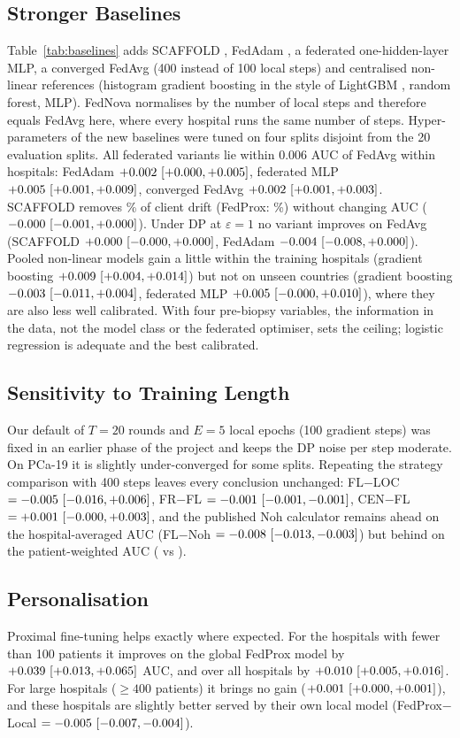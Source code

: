 \subsection{Stronger Baselines}
\label{sec:p19_baselines}
Table~\ref{tab:baselines} adds SCAFFOLD \cite{Karimireddy2020Scaffold}, FedAdam \cite{Reddi2021FedOpt}, a federated one-hidden-layer MLP, a converged FedAvg (400 instead of 100 local steps) and centralised non-linear references (histogram gradient boosting in the style of LightGBM \cite{Ke2017LightGBM}, random forest, MLP). FedNova \cite{Wang2020FedNova} normalises by the number of local steps and therefore equals FedAvg here, where every hospital runs the same number of steps. Hyper-parameters of the new baselines were tuned on four splits disjoint from the 20 evaluation splits. All federated variants lie within 0.006 AUC of FedAvg within hospitals: FedAdam $+0.002\ [+0.000, +0.005]$, federated MLP $+0.005\ [+0.001, +0.009]$, converged FedAvg $+0.002\ [+0.001, +0.003]$. SCAFFOLD removes \blScafDrift\% of client drift (FedProx: \blProxDrift\%) without changing AUC ($-0.000\ [-0.001, +0.000]$). Under DP at $\varepsilon=1$ no variant improves on FedAvg (SCAFFOLD $+0.000\ [-0.000, +0.000]$, FedAdam $-0.004\ [-0.008, +0.000]$). Pooled non-linear models gain a little within the training hospitals (gradient boosting $+0.009\ [+0.004, +0.014]$) but not on unseen countries (gradient boosting $-0.003\ [-0.011, +0.004]$, federated MLP $+0.005\ [-0.000, +0.010]$), where they are also less well calibrated. With four pre-biopsy variables, the information in the data, not the model class or the federated optimiser, sets the ceiling; logistic regression is adequate and the best calibrated.



\subsection{Sensitivity to Training Length}
Our default of $T=20$ rounds and $E=5$ local epochs (100 gradient steps) was fixed in an earlier phase of the project and keeps the DP noise per step moderate. On PCa-19 it is slightly under-converged for some splits. Repeating the strategy comparison with 400 steps leaves every conclusion unchanged: FL$-$LOC $=-0.005\ [-0.016, +0.006]$, FR$-$FL $=-0.001\ [-0.001, -0.001]$, CEN$-$FL $=+0.001\ [-0.000, +0.003]$, and the published Noh calculator remains ahead on the hospital-averaged AUC (FL$-$Noh $=-0.008\ [-0.013, -0.003]$) but behind on the patient-weighted AUC (\cvgWFL{} vs \cvgWNoh{}).

\subsection{Personalisation}
Proximal fine-tuning helps exactly where expected. For the \pNSmall{} hospitals with fewer than 100 patients it improves on the global FedProx model by $+0.039\ [+0.013, +0.065]$ AUC, and over all hospitals by $+0.010\ [+0.005, +0.016]$. For large hospitals ($\geq 400$ patients) it brings no gain ($+0.001\ [+0.000, +0.001]$), and these hospitals are slightly better served by their own local model (FedProx$-$Local $=-0.005\ [-0.007, -0.004]$).

